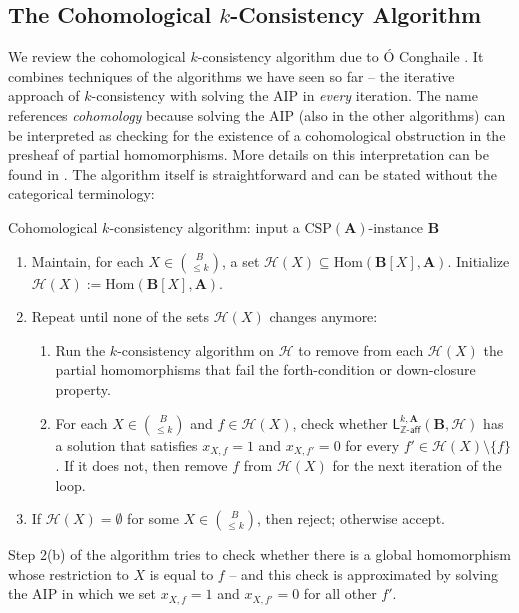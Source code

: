 \documentclass[a4paper,english, thm-restate]{lipics-v2021}
\newcommand{\ZZ}{\mathbb{Z}}
\newcommand{\StructA}{\mathbf{A}}
\newcommand{\StructB}{\mathbf{B}}
\newcommand{\CSP}[1]{\mathrm{CSP}(#1)}
\newcommand{\Hom}[2]{\mathrm{Hom}(#1,#2)}
\newcommand{\leqs}{\mathsf{L}}
\newcommand{\zafkleq}[4]{\leqs^{#1,#2}_{\ZZ\mathsf{\text{-}aff}}(#3,#4)}
\newcommand{\Hh}{\mathcal{H}}
\begin{document}
	
	
	
	
	
	\subsection{The Cohomological \texorpdfstring{$k$}{k}-Consistency Algorithm}
	\label{app:cohomology}
	We review the cohomological $k$-consistency algorithm due to Ó Conghaile \cite{OConghaile22}.
	It combines techniques of the algorithms we have seen so far --
	the iterative approach of $k$-consistency with solving the AIP
	in \emph{every} iteration.
	The name references \emph{cohomology} because solving the AIP (also in the other algorithms)
	can be interpreted as checking for the existence of a cohomological obstruction in the presheaf of partial homomorphisms. More details on this interpretation can be found in \cite{OConghaile22}. The algorithm itself is straightforward and can be stated without the categorical terminology:
	
	\begin{algobox}{Cohomological $k$-consistency algorithm:
			input a $\CSP{\StructA}$-instance $\StructB$}
		\begin{enumerate}
			\item Maintain, for each $X \in \binom{B}{ \leq k}$, a set $\Hh(X) \subseteq \Hom{\StructB[X]}{\StructA}$. Initialize $\Hh(X) := \Hom{\StructB[X]}{\StructA}$.
			\item Repeat until none of the sets $\Hh(X)$ changes anymore: 
			\begin{enumerate}
				\item Run the $k$-consistency algorithm on $\Hh$ to remove from each $\Hh(X)$ the partial homomorphisms that fail the forth-condition or down-closure property.
				\item For each $X \in \binom{B}{ \leq k}$ and $f \in \Hh(X)$, check whether $\zafkleq{k}{\StructA}{\StructB}{\Hh}$ has a solution that satisfies $x_{X,f} = 1$ and $x_{X,f'} = 0$ for every $f' \in \Hh(X) \setminus \{f\}$. If it does not, then remove $f$ from $\Hh(X)$ for the next iteration of the loop. 
			\end{enumerate}	
			\item If $\Hh(X) = \emptyset$ for some $X \in \binom{B}{\leq k}$, then reject; otherwise accept. 
		\end{enumerate}
	\end{algobox}
	Step 2(b) of the algorithm tries to check whether
	there is a global homomorphism whose restriction to $X$ is equal to $f$
	-- and this check is approximated by solving the AIP
	in which we set $x_{X,f} = 1$ and $x_{X,f'} = 0$ for all other $f'$.
	
\end{document}

